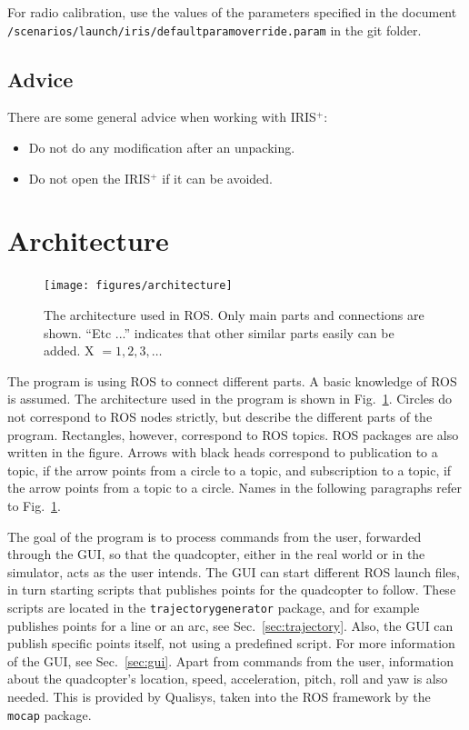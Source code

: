 \documentclass[titlepage,11pt,a4paper]{article}
\begin{document}
For radio calibration, use the values of the parameters specified in the document \texttt{/scenarios/launch/iris/default\textunderscore param\textunderscore override.param} in the git folder.

\subsection{Advice}
\label{subsec:advice}
There are some general advice when working with IRIS$^+$:

\begin{itemize}
  \item Do not do any modification after an unpacking.
  \item Do not open the IRIS$^+$ if it can be avoided.
\end{itemize}


\section{Architecture}
\label{sec:architecture}

\begin{figure}[h!]                                                               
  \centering \texttt{[image: figures/architecture]}
  \caption{The architecture used in ROS. Only main parts and
    connections are shown. ``Etc ...'' indicates that other similar
    parts easily can be added. X $= 1, 2, 3, \dots$}
  \label{fig:architecture}                                                              
\end{figure}

The program is using ROS to connect different parts. A basic knowledge
of ROS is assumed. The architecture used in the program is shown in
Fig.~\ref{fig:architecture}. Circles do not correspond to ROS nodes
strictly, but describe the different parts of the program. Rectangles,
however, correspond to ROS topics. ROS packages are also written in
the figure. Arrows with black heads correspond to publication to a
topic, if the arrow points from a circle to a topic, and subscription
to a topic, if the arrow points from a topic to a circle. Names in the
following paragraphs refer to Fig.~\ref{fig:architecture}.

The goal of the program is to process commands from the user,
forwarded through the GUI, so that the quadcopter, either in the real
world or in the simulator, acts as the user intends. The GUI can start
different ROS launch files, in turn starting scripts that publishes
points for the quadcopter to follow. These scripts are located in the
\texttt{trajectory\textunderscore generator} package, and for example
publishes points for a line or an arc, see
Sec.~\ref{sec:trajectory}. Also, the GUI can publish specific points
itself, not using a predefined script. For more information of the
GUI, see Sec.~\ref{sec:gui}. Apart from commands from the user,
information about the quadcopter's location, speed, acceleration,
pitch, roll and yaw is also needed. This is provided by Qualisys,
taken into the ROS framework by the \texttt{mocap} package.
\end{document}
